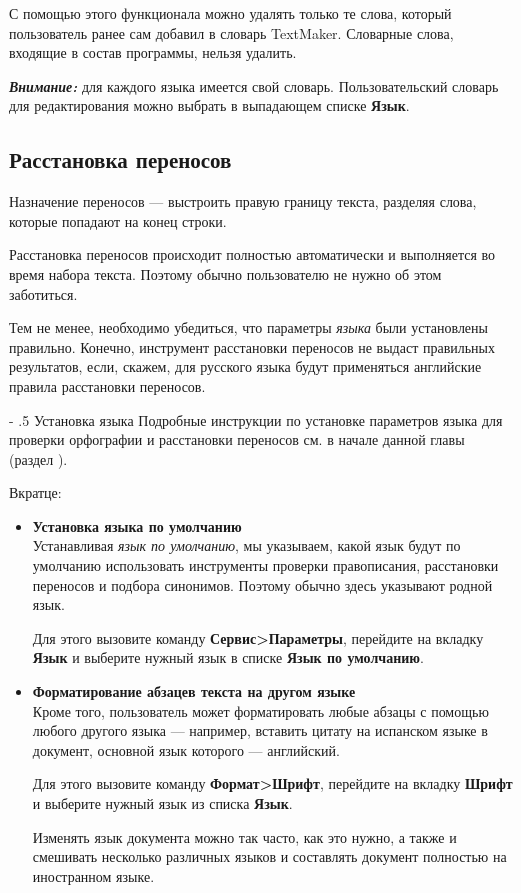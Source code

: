 ﻿\documentclass[a4paper,10pt]{article}
\makeatletter
\renewcommand\paragraph{%
   \@startsection{paragraph}{4}{0mm}%
      {-\baselineskip}%
      {.5\baselineskip}%
      {\normalfont\normalsize\bfseries}}
\makeatother
\begin{document}
С помощью этого функционала можно удалять только те слова, который пользователь ранее сам добавил в словарь TextMaker. Словарные слова, входящие в состав программы, нельзя удалить.

\begin{mdframed}[backgroundcolor=blue!10]
\textbf{\textit{Внимание:}} для каждого языка имеется свой словарь. Пользовательский словарь для редактирования можно выбрать в выпадающем списке \textbf{Язык}.
\end{mdframed}

\subsection{Расстановка переносов}
Назначение переносов — выстроить правую границу текста, разделяя слова, которые попадают на конец строки.

Расстановка переносов происходит полностью автоматически и выполняется во время набора текста. Поэтому обычно пользователю не нужно об этом заботиться.

Тем не менее, необходимо убедиться, что параметры \textit{языка} были установлены правильно. Конечно, инструмент расстановки переносов не выдаст правильных результатов, если, скажем, для русского языка будут применяться английские правила расстановки переносов.

\paragraph{Установка языка}
Подробные инструкции по установке параметров языка для проверки орфографии и расстановки переносов см. в начале данной главы (раздел ).

Вкратце:

\begin{itemize}
 \item \textbf{Установка языка по умолчанию}\\
 Устанавливая \textit{язык по умолчанию}, мы указываем, какой язык будут по умолчанию использовать инструменты проверки правописания, расстановки переносов и подбора синонимов. Поэтому обычно здесь указывают родной язык.
 
 Для этого вызовите команду \textbf{Сервис>Параметры}, перейдите на вкладку \textbf{Язык} и выберите нужный язык в списке \textbf{Язык по умолчанию}.
 \item \textbf{Форматирование абзацев текста на другом языке}\\
 Кроме того, пользователь может форматировать любые абзацы с помощью любого другого языка — например, вставить цитату на испанском языке в документ, основной язык которого — английский.
 
 Для этого вызовите команду \textbf{Формат>Шрифт}, перейдите на вкладку \textbf{Шрифт} и выберите нужный язык из списка \textbf{Язык}.
 
 Изменять язык документа можно так часто, как это нужно, а также и смешивать несколько различных языков и составлять документ полностью на иностранном языке.
\end{itemize}
\end{document}
